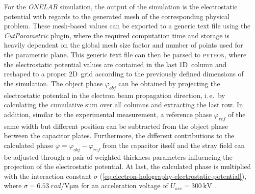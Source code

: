 For the \emph{ONELAB} simulation, the output of the simulation is the electrostatic potential with regards to the generated mesh of the corresponding physical problem. These mesh-based values can be exported to a generic text file using the \emph{CutParametric} plugin, where the required computation time and storage is heavily dependent on the global mesh size factor and number of points used for the parametric plane. This generic text file can then be parsed to \textsc{python}, where the electrostatic potential values are contained in the last 1D~column and reshaped to a proper 2D~grid according to the previously defined dimensions of the simulation. The object phase $\varphi_{\mathit{obj}}$ can be obtained by projecting the electrostatic potential in the electron beam propagation direction, i.\,e.\ by calculating the cumulative sum over all columns and extracting the last row. In addition, similar to the experimental measurement, a reference phase $\varphi_{\mathit{ref}}$ of the same width but different position can be subtracted from the object phase between the capacitor plates. Furthermore, the different contributions to the calculated phase $\varphi = \varphi_{\mathit{obj}} - \varphi_{\mathit{ref}}$ from the capacitor itself and the stray field can be adjusted through a pair of weighted thickness parameters influencing the projection of the electrostatic potential. At last, the calculated phase is multiplied with the interaction constant $\sigma$ (\cref{eq:electron-holography-electrostatic-potential}), where $\sigma = \SI{6.53}{rad \per \volt \um}$ for an acceleration voltage of $U_{\mathit{acc}} = \SI{300}{\kilo\volt}$ \cite{Beleggia2014}.

